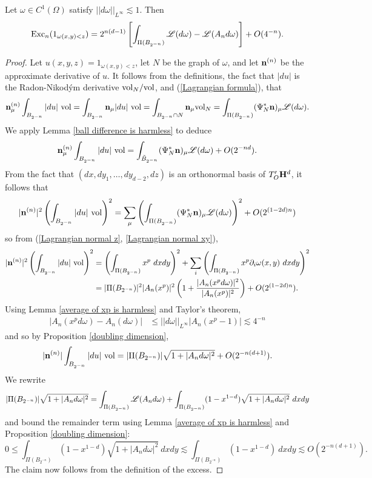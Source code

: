 \begin{lemma}\label{excess vs plateau energy}
Let $\omega \in C^1(\Omega)$ satisfy $||d\omega||_{L^\infty} \lesssim 1$. Then
\begin{align*}
    \operatorname{Exc}_n(1_{\omega(x, y) < z}) = 2^{n(d - 1)} \left[\int_{\Pi(B_{2^{-n}})} \mathscr L(d\omega) - \mathscr L(A_n d\omega)\right] + O(4^{-n}).
\end{align*}
\end{lemma}
\begin{proof}
Let $u(x, y, z) = 1_{\omega(x, y) < z}$, let $N$ be the graph of $\omega$, and let $\mathbf n^{(n)}$ be the approximate derivative of $u$.
It follows from the definitions, the fact that $|du|$ is the Radon-Nikod\'ym derivative $\mathrm{vol}_N/\mathrm{vol}$, and (\ref{Lagrangian formula}), that
$$\mathbf n^{(n)}_\mu \int_{B_{2^{-n}}} |du| ~\mathrm{vol} = \int_{B_{2^{-n}}} \mathbf n_\mu |du| ~\mathrm{vol} = \int_{B_{2^{-n}} \cap N} \mathbf n_\mu \mathrm{vol}_N = \int_{\Pi(B_{2^{-n}})} (\Psi_N^* \mathbf n)_\mu \mathscr L(d\omega).$$
We apply Lemma \ref{ball difference is harmless} to deduce 
$$\mathbf n^{(n)}_\mu \int_{B_{2^{-n}}} |du| ~\mathrm{vol} = \int_{\tilde B_{2^{-n}}} (\Psi_N^* \mathbf n)_\mu \mathscr L(d\omega) + O(2^{-nd}).$$
From the fact that $(dx, dy_1, \dots, dy_{d - 2}, dz)$ is an orthonormal basis of $T_O' \mathbf H^d$, it follows that 
$$|\mathbf n^{(n)}|^2 \left(\int_{B_{2^{-n}}} |du| ~\mathrm{vol}\right)^2 = \sum_\mu \left(\int_{\Pi(B_{2^{-n}})} (\Psi_N^* \mathbf n)_\mu \mathscr L(d\omega)\right)^2 + O(2^{(1 - 2d)n})$$
so from (\ref{Lagrangian normal z}, \ref{Lagrangian normal xy}),
\begin{align*}
    |\mathbf n^{(n)}|^2 \left(\int_{B_{2^{-n}}} |du| ~\mathrm{vol}\right)^2 &= \left(\int_{\Pi(B_{2^{-n}})} x^p ~dxdy\right)^2 + \sum_i \left(\int_{\Pi(B_{2^{-n}})} x^p \partial_i \omega(x, y) ~dxdy \right)^2 \\
    &= |\Pi(B_{2^{-n}})|^2 |A_n (x^p)|^2 \left(1 + \frac{|A_n(x^p d\omega)|^2}{|A_n (x^p)|^2}\right) + O(2^{(1 - 2d)n}).
\end{align*}
Using Lemma \ref{average of xp is harmless} and Taylor's theorem,
\begin{align*}
    |A_n(x^p d\omega) - A_n (d\omega)| &\leq ||d\omega||_{L^\infty} |A_n (x^p - 1)| \lesssim 4^{-n}
\end{align*}
and so by Proposition \ref{doubling dimension},
$$|\mathbf n^{(n)}| \int_{B_{2^{-n}}} |du| ~\mathrm{vol} = |\Pi(B_{2^{-n}})| \sqrt{1 + |A_n d\omega|^2} + O(2^{-n(d + 1)}).$$
We rewrite 
$$|\Pi(B_{2^{-n}})| \sqrt{1 + |A_n d\omega|^2} = \int_{\Pi(B_{2^{-n}})} \mathscr L(A_nd\omega) + \int_{\Pi(B_{2^{-n}})} (1 - x^{1 - d})\sqrt{1 + |A_n d\omega|^2} ~dxdy$$
and bound the remainder term using Lemma \ref{average of xp is harmless} and Proposition \ref{doubling dimension}:
$$0 \leq \int_{\Pi(B_{2^{-n}})} (1 - x^{1 - d})\sqrt{1 + |A_n d\omega|^2} ~dxdy \lesssim \int_{\Pi(B_{2^{-n}})} (1 - x^{1-d}) ~dxdy \lesssim O(2^{-n(d + 1)}).$$
The claim now follows from the definition of the excess.
\end{proof}

